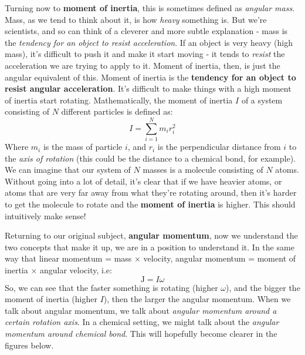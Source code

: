 \documentclass{memoir}[11pt,oneside,a4paper,openany]
\newcommand{\Jc}{\ensuremath{\mathrm{J}}}
\begin{document}
Turning now to \textbf{moment of inertia}, this is sometimes defined as \emph{angular mass}. Mass, as we tend to think about it, is how \emph{heavy} something is. But we're scientists, and so can think of a cleverer and more subtle explanation - mass is the \emph{tendency for an object to resist acceleration}. If an object is very heavy (high mass), it's difficult to push it and make it start moving - it tends to \emph{resist} the acceleration we are trying to apply to it. Moment of inertia, then, is just the angular equivalent of this. Moment of inertia is the \textbf{tendency for an object to resist angular acceleration}. It's difficult to make things with a high moment of inertia start rotating. Mathematically, the moment of inertia $I$ of a system consisting of $N$ different particles is defined as:
\begin{equation}
	I = \sum_{i=1}^N m_ir_i^2
\end{equation}
Where $m_i$ is the mass of particle $i$, and $r_i$ is the perpendicular distance from $i$ to the \emph{axis of rotation} (this could be the distance to a chemical bond, for example). We can imagine that our system of $N$ masses is a molecule consisting of $N$ atoms. Without going into a lot of detail, it's clear that if we have heavier atoms, or atoms that are very far away from what they're rotating around, then it's harder to get the molecule to rotate and the \textbf{moment of inertia} is higher. This should intuitively make sense! 

Returning to our original subject, \textbf{angular momentum}, now we understand the two concepts that make it up, we are in a position to understand it. In the same way that linear momentum = mass $\times$ velocity, angular momentum = moment of inertia $\times$ angular velocity, i.e:
\begin{equation}
	\Jc = I\omega
\end{equation}
So, we can see that the faster something is rotating (higher $\omega$), and the bigger the moment of inertia (higher $I$), then the larger the angular momentum. When we talk about angular momentum, we talk about \emph{angular momentum around a certain rotation axis}. In a chemical setting, we might talk about the \emph{angular momentum around chemical bond}. This will hopefully become clearer in the figures below.
\end{document}
